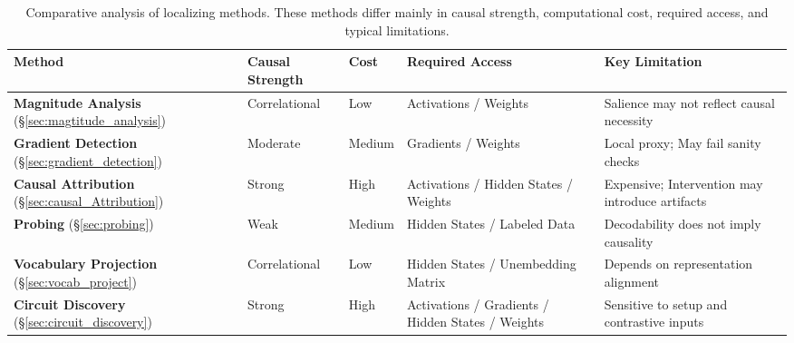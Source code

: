 \begin{table}[!t]
    \centering
    \caption{Comparative analysis of localizing methods. These methods differ mainly in causal strength, computational cost, required access, and typical limitations.}
    \label{tab:localizing_methods_comparison}
    \small
    \setlength{\tabcolsep}{3pt}
    \renewcommand{\arraystretch}{1.1}
    \begin{tabular}{p{} p{} p{} p{} p{}}
    \toprule[1.3pt]
    \textbf{Method} & \textbf{Causal Strength} & \textbf{Cost} & \textbf{Required Access} & \textbf{Key Limitation} \\
    \midrule
    \textbf{Magnitude Analysis} (\S\ref{sec:magtitude_analysis}) & Correlational & Low & Activations / Weights & Salience may not reflect causal necessity \\
    \textbf{Gradient Detection} (\S\ref{sec:gradient_detection}) & Moderate & Medium & Gradients / Weights & Local proxy; May fail sanity checks \\
    \textbf{Causal Attribution} (\S\ref{sec:causal_Attribution}) & Strong & High & Activations / Hidden States / Weights & Expensive; Intervention may introduce artifacts \\
    \textbf{Probing} (\S\ref{sec:probing}) & Weak & Medium & Hidden States / Labeled Data & Decodability does not imply causality \\
    \textbf{Vocabulary Projection} (\S\ref{sec:vocab_project}) & Correlational & Low & Hidden States / Unembedding Matrix & Depends on representation alignment \\
    \textbf{Circuit Discovery} (\S\ref{sec:circuit_discovery}) & Strong & High & Activations / Gradients / Hidden States / Weights & Sensitive to setup and contrastive inputs \\
    \bottomrule[1.3pt]
    \end{tabular}
\end{table}